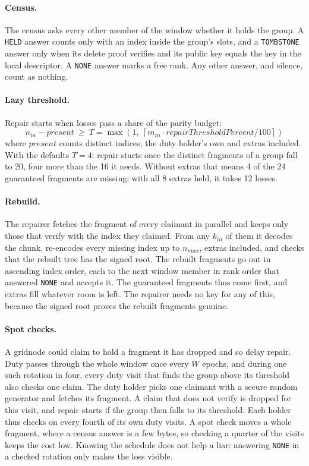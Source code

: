 \documentclass[10pt,a4paper,final]{article}
\newcommand{\code}[1]{\texttt{#1}}
\begin{document}
\paragraph{Census.} The census asks every other member of the window whether it holds the group. A \code{HELD}
answer counts only with an index inside the group's slots, and a \code{TOMBSTONE} answer only when its delete proof
verifies and its public key equals the key in the local descriptor. A \code{NONE} answer marks a free rank. Any
other answer, and silence, count as nothing.

\paragraph{Lazy threshold.} Repair starts when losses pass a share of the parity budget:
\begin{equation}
	n_{in} - \mathit{present} \ \ge\ T = \max\left(1,\ \left\lceil m_{in} \cdot \mathit{repairThresholdPercent} / 100
	\right\rceil\right)
\end{equation}
where $\mathit{present}$ counts distinct indices, the duty holder's own and extras included. With the defaults
$T = 4$: repair starts once the distinct fragments of a group fall to 20, four more than the 16 it needs. Without
extras that means 4 of the 24 guaranteed fragments are missing; with all 8 extras held, it takes 12 losses.

\paragraph{Rebuild.} The repairer fetches the fragment of every claimant in parallel and keeps only those that verify
with the index they claimed. From any $k_{in}$ of them it decodes the chunk, re-encodes every missing index up to
$n_{max}$, extras included, and checks that the rebuilt tree has the signed root. The rebuilt fragments go out in
ascending index order, each to the next window member in rank order that answered \code{NONE} and accepts it. The
guaranteed fragments thus come first, and extras fill whatever room is left. The repairer needs no key for any of
this, because the signed root proves the rebuilt fragments genuine.

\paragraph{Spot checks.} A gridnode could claim to hold a fragment it has dropped and so delay repair. Duty passes
through the whole window once every $W$ epochs, and during one such rotation in four, every duty visit that finds the
group above its threshold also checks one claim. The duty holder picks one claimant with a secure random generator
and fetches its fragment. A claim that does not verify is dropped for this visit, and repair starts if the group then
falls to its threshold. Each holder thus checks on every fourth of its own duty visits. A spot check moves a whole
fragment, where a census answer is a few bytes, so checking a quarter of the visits keeps the cost low. Knowing the
schedule does not help a liar: answering \code{NONE} in a checked rotation only makes the loss visible.
\end{document}
